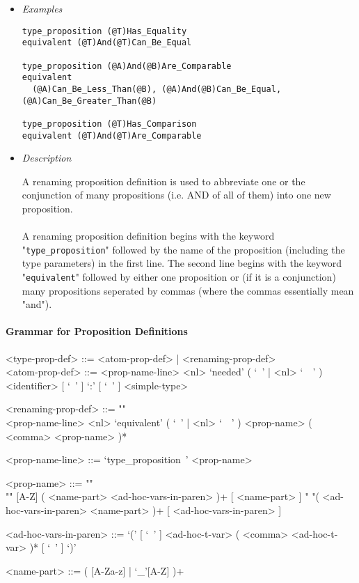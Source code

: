 \documentclass{article}
\begin{document}
\begin{itemize}
\item \textit{Examples}
\begin{verbatim}
type_proposition (@T)Has_Equality
equivalent (@T)And(@T)Can_Be_Equal

type_proposition (@A)And(@B)Are_Comparable
equivalent
  (@A)Can_Be_Less_Than(@B), (@A)And(@B)Can_Be_Equal, (@A)Can_Be_Greater_Than(@B)

type_proposition (@T)Has_Comparison
equivalent (@T)And(@T)Are_Comparable
\end{verbatim}

\item \textit{Description}

A renaming proposition definition is used to abbreviate one or the conjunction
of many propositions (i.e. AND of all of them) into one new proposition.
\\\\
A renaming proposition definition begins with the keyword
"\verb|type_proposition|" followed by the name of the proposition (including
the type parameters) in the first line. The second line begins with the keyword
"\verb|equivalent|" followed by either one proposition or (if it is a
conjunction) many propositions seperated by commas (where the commas
essentially mean "and").

\end{itemize}

\paragraph{Grammar for Proposition Definitions}

\begin{grammar}
<type-prop-def> ::= <atom-prop-def> | <renaming-prop-def>
\\

<atom-prop-def> ::=
<prop-name-line> <nl> `needed' ( `\ ' | <nl> `\ \ ' )
<identifier> [ `\ ' ] `:' [ `\ ' ] <simple-type>

<renaming-prop-def> ::= ""\\
<prop-name-line> <nl>
`equivalent' ( `\ ' | <nl> `\ \ ' ) <prop-name> ( <comma> <prop-name> )*

<prop-name-line> ::= `type_proposition\ ' <prop-name>

<prop-name> ::=  ""\\""
[A-Z] ( <name-part> <ad-hoc-vars-in-paren> )+ [ <name-part> ]
\alt " "( <ad-hoc-vars-in-paren> <name-part> )+ [ <ad-hoc-vars-in-paren> ]

<ad-hoc-vars-in-paren> ::=
`(' [ `\ ' ] <ad-hoc-t-var> ( <comma> <ad-hoc-t-var> )* [ `\ ' ] `)'

<name-part> ::= ( [A-Za-z] | `_'[A-Z] )+
\end{grammar}
\end{document}
